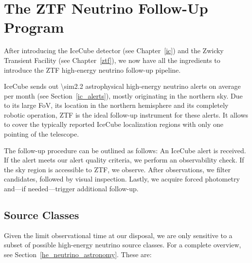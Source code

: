 \chapter{The ZTF Neutrino Follow-Up Program}\label{fupipeline}
After introducing the IceCube detector (see Chapter~\ref{ic}) and the Zwicky Transient Facility (see Chapter~\ref{ztf}), we now have all the ingredients to introduce the ZTF high-energy neutrino follow-up pipeline.

IceCube sends out \num{\sim2.2} astrophysical high-energy neutrino alerts on average per month (see Section~\ref{ic_alerts}), mostly originating in the northern sky. Due to its large FoV, its location in the northern hemisphere and its completely robotic operation, ZTF is the ideal follow-up instrument for these alerts. It allows to cover the typically reported IceCube localization regions with only one pointing of the telescope.

The follow-up procedure can be outlined as follows: An IceCube alert is received. If the alert meets our alert quality criteria, we perform an observability check. If the sky region is accessible to ZTF, we observe. After observations, we filter candidates, followed by visual inspection. Lastly, we acquire forced photometry and---if needed---trigger additional follow-up.

\section{Source Classes}
Given the limit observational time at our disposal, we are only sensitive to a subset of possible high-energy neutrino source classes. For a complete overview, see Section~\ref{he_neutrino_astronomy}. These are:

